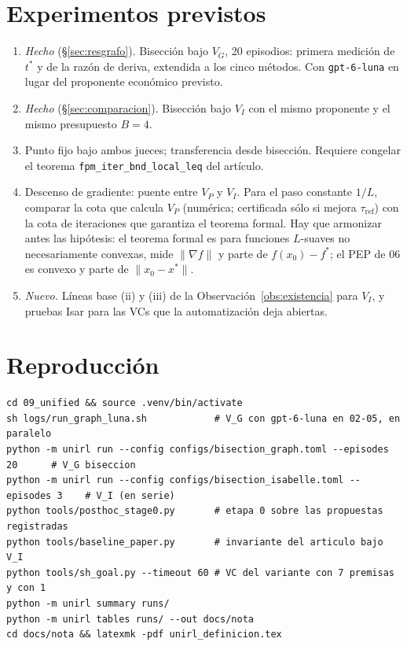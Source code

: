 \documentclass[11pt,a4paper]{article}
\theoremstyle{definition}
\theoremstyle{remark}
\begin{document}
\section{Experimentos previstos}

\begin{enumerate}
  \item \emph{Hecho} (§\ref{sec:resgrafo}). Bisección bajo $V_G$, 20 episodios: primera medición de $t^*$ y de la razón de deriva, extendida a los cinco métodos. Con \texttt{gpt-6-luna} en lugar del proponente económico previsto.
  \item \emph{Hecho} (§\ref{sec:comparacion}). Bisección bajo $V_I$ con el mismo proponente y el mismo presupuesto $B=4$.
  \item Punto fijo bajo ambos jueces; transferencia desde bisección. Requiere congelar el teorema \texttt{fpm\_iter\_bnd\_\allowbreak{}local\_leq} del artículo.
  \item Descenso de gradiente: puente entre $V_P$ y $V_I$. Para el paso constante $1/L$, comparar la cota que calcula $V_P$ (numérica; certificada sólo si mejora $\tau_{\mathrm{ref}}$) con la cota de iteraciones que garantiza el teorema formal. Hay que armonizar antes las hipótesis: el teorema formal es para funciones $L$-suaves no necesariamente convexas, mide $\|\nabla f\|$ y parte de $f(x_0) - f^*$; el PEP de 06 es convexo y parte de $\|x_0 - x^*\|$.
  \item \emph{Nuevo.} Líneas base (ii) y (iii) de la Observación~\ref{obs:existencia} para $V_I$, y pruebas Isar para las VCs que la automatización deja abiertas.
\end{enumerate}

\appendix

\section{Reproducción}\label{app:repro}

\begin{lstlisting}
cd 09_unified && source .venv/bin/activate
sh logs/run_graph_luna.sh            # V_G con gpt-6-luna en 02-05, en paralelo
python -m unirl run --config configs/bisection_graph.toml --episodes 20      # V_G biseccion
python -m unirl run --config configs/bisection_isabelle.toml --episodes 3    # V_I (en serie)
python tools/posthoc_stage0.py       # etapa 0 sobre las propuestas registradas
python tools/baseline_paper.py       # invariante del articulo bajo V_I
python tools/sh_goal.py --timeout 60 # VC del variante con 7 premisas y con 1
python -m unirl summary runs/
python -m unirl tables runs/ --out docs/nota
cd docs/nota && latexmk -pdf unirl_definicion.tex
\end{lstlisting}
\end{document}
